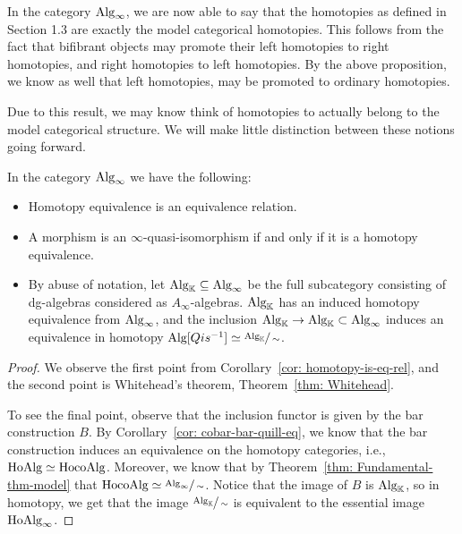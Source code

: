 \documentclass[../thesis.tex]{subfiles}
\begin{document}
    \begin{remark}
        In the category $\tt{Alg}_\infty$, we are now able to say that the homotopies as defined in Section 1.3 are exactly the model categorical homotopies. This follows from the fact that bifibrant objects may promote their left homotopies to right homotopies, and right homotopies to left homotopies. By the above proposition, we know as well that left homotopies, may be promoted to ordinary homotopies.
    \end{remark}

    Due to this result, we may know think of homotopies to actually belong to the model categorical structure. We will make little distinction between these notions going forward.

    \begin{thm}\label{thm: model-Alg-inf}
        In the category $\tt{Alg}_\infty$ we have the following:
        \begin{itemize}
            \item Homotopy equivalence is an equivalence relation.
            \item A morphism is an $\infty$-quasi-isomorphism if and only if it is a homotopy equivalence.
            \item By abuse of notation, let $\tt{Alg}_\mathbb{K} \subseteq \tt{Alg}_\infty$ be the full subcategory consisting of dg-algebras considered as $A_\infty$-algebras. $\tt{Alg}_\mathbb{K}$ has an induced homotopy equivalence from $\tt{Alg}_\infty$, and the inclusion $\tt{Alg}_\mathbb{K} \rightarrow \tt{Alg}_\mathbb{K} \subset \tt{Alg}_\infty$ induces an equivalence in homotopy $\tt{Alg}[Qis^{-1}] \simeq \sfrac{\tt{Alg}_\mathbb{K}}{\sim}$.
        \end{itemize}
    \end{thm}

    \begin{proof}
        We observe the first point from Corollary~\ref{cor: homotopy-is-eq-rel}, and the second point is Whitehead's theorem, Theorem~\ref{thm: Whitehead}.

        To see the final point, observe that the inclusion functor is given by the bar construction $B$. By Corollary~\ref{cor: cobar-bar-quill-eq}, we know that the bar construction induces an equivalence on the homotopy categories, i.e., $\tt{Ho}\tt{Alg} \simeq \tt{Ho}\tt{coAlg}$. Moreover, we know that by Theorem~\ref{thm: Fundamental-thm-model} that $\tt{Ho}\tt{coAlg} \simeq \sfrac{\tt{Alg}_\infty}{\sim}$. Notice that the image of $B$ is $\tt{Alg}_\mathbb{K}$, so in homotopy, we get that the image $\sfrac{\tt{Alg}_\mathbb{K}}{\sim}$ is equivalent to the essential image $\tt{Ho}\tt{Alg}_\infty$.
    \end{proof}
\end{document}
